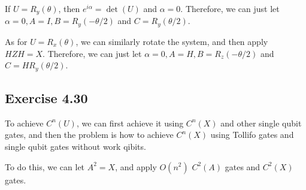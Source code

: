 If $U=R_y(\theta)$, then $e^{i\alpha}=\det(U)$ and $\alpha=0$. Therefore, we can just let $\alpha=0, A=I,B=R_y(-\theta/2)$ and $C=R_y(\theta/2)$.

As for $U=R_x(\theta)$, we can similarly rotate the system, and then apply $HZH=X$. Therefore, we can just let $\alpha = 0, A = H, B =R_z(-\theta/2)$ and $C=HR_y(\theta/2)$.

\subsection*{Exercise 4.30}

To achieve $C^n(U)$, we can first achieve it using $C^n(X)$ and other single qubit gates, and then the problem is how to achieve $C^n(X)$ using Tollifo gates and single qubit gates without work qibits.

To do this, we can let $A^2=X$, and apply $O(n^2)$ $C^2(A)$ gates and $C^2(X)$ gates.
